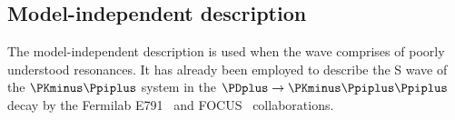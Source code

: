 \documentclass[
	fontsize=10pt,
	open=right,
	twoside,
    english,
    draft,
]{scrbook}
\begin{document}
    \subsection{Model-independent description}

    The model-independent description is used when the wave comprises of poorly understood resonances.
    It has already been employed to describe the S wave of the $\PKminus\Ppiplus$ system in the $\PDplus \to \PKminus\Ppiplus\Ppiplus$ decay by the Fermilab E791~\cite{PhysRevD.73.032004} and FOCUS~\cite{Link200914} collaborations.

%
\backmatter
	\printnoidxglossaries

	\cleardoublepage
	\printindex

	\cleardoublepage
	\nocite{*}
	\printbibliography
\end{document}
